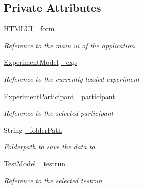 \subsection*{Private Attributes}
\begin{DoxyCompactItemize}
\item 
\hyperlink{class_web_analyzer_1_1_u_i_1_1_h_t_m_l_u_i}{H\+T\+M\+L\+U\+I} \hyperlink{class_web_analyzer_1_1_u_i_1_1_interaction_objects_1_1_analysis_export_control_ac37986028e8f14ebe20b3e70cc2bafe5}{\+\_\+form}
\begin{DoxyCompactList}\small\item\em Reference to the main ui of the application \end{DoxyCompactList}\item 
\hyperlink{class_web_analyzer_1_1_models_1_1_base_1_1_experiment_model}{Experiment\+Model} \hyperlink{class_web_analyzer_1_1_u_i_1_1_interaction_objects_1_1_analysis_export_control_a7e42e87000b58fb02e37f994efc61259}{\+\_\+exp}
\begin{DoxyCompactList}\small\item\em Reference to the currently loaded experiment \end{DoxyCompactList}\item 
\hyperlink{class_web_analyzer_1_1_models_1_1_base_1_1_experiment_participant}{Experiment\+Participant} \hyperlink{class_web_analyzer_1_1_u_i_1_1_interaction_objects_1_1_analysis_export_control_ace272af8988b6cfc198db79bb6c2cd13}{\+\_\+participant}
\begin{DoxyCompactList}\small\item\em Reference to the selected participant \end{DoxyCompactList}\item 
String \hyperlink{class_web_analyzer_1_1_u_i_1_1_interaction_objects_1_1_analysis_export_control_a52ae3dbae930a01e4ddb368fdd820ac7}{\+\_\+folder\+Path}
\begin{DoxyCompactList}\small\item\em Folderpath to save the data to \end{DoxyCompactList}\item 
\hyperlink{class_web_analyzer_1_1_models_1_1_data_model_1_1_test_model}{Test\+Model} \hyperlink{class_web_analyzer_1_1_u_i_1_1_interaction_objects_1_1_analysis_export_control_adb1ac5a4139c8bee5b1c694983154936}{\+\_\+testrun}
\begin{DoxyCompactList}\small\item\em Reference to the selected testrun \end{DoxyCompactList}\item 

\end{DoxyCompactItemize}
